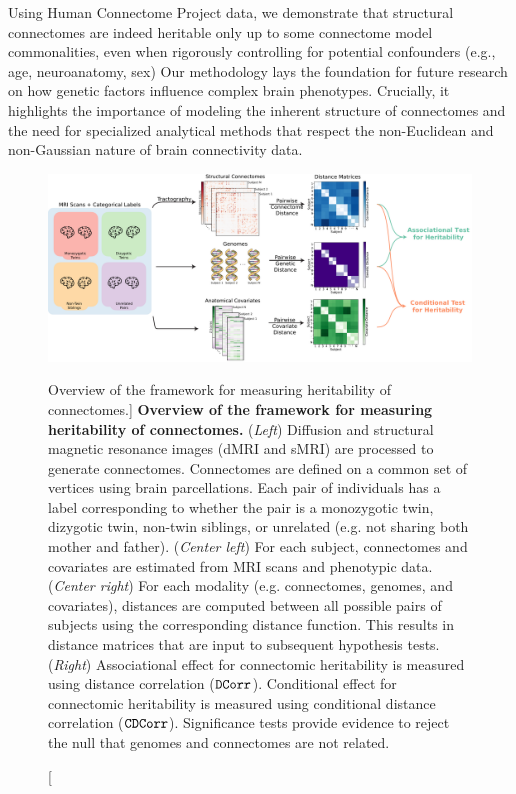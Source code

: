 Using Human Connectome Project data, we demonstrate that structural connectomes are indeed heritable only up to some connectome model commonalities, even when rigorously controlling for potential confounders (e.g., age, neuroanatomy, sex) 
Our methodology lays the foundation for future research on how genetic factors influence complex brain phenotypes. Crucially, it highlights the importance of modeling the inherent structure of connectomes and the need for specialized analytical methods that respect the non-Euclidean and non-Gaussian nature of brain connectivity data.

\begin{figure}%
  \centering
  \includegraphics[width=1\linewidth]{figures/herit/framework.pdf}
  \caption
  [Overview of the framework for measuring heritability of connectomes.]
  {\textbf{Overview of the framework for measuring heritability of connectomes.} (\textit{Left}) Diffusion and structural magnetic resonance images (dMRI and sMRI) are processed to generate connectomes. Connectomes are defined on a common set of vertices using brain parcellations. Each pair of individuals has a label corresponding to whether the pair is a monozygotic twin, dizygotic twin, non-twin siblings, or unrelated (e.g. not sharing both mother and father).
  (\textit{Center left}) For each subject, connectomes and covariates are estimated from MRI scans and phenotypic data.
  (\textit{Center right}) For each modality (e.g. connectomes, genomes, and covariates), distances are computed between all possible pairs of subjects using the corresponding distance function. This results in distance matrices that are input to subsequent hypothesis tests.
  (\textit{Right}) Associational effect for connectomic heritability is measured using distance correlation ($\operatorname{\mathtt{DCorr}}$). Conditional effect for connectomic heritability is measured using conditional distance correlation ($\operatorname{\mathtt{CDCorr}}$). Significance tests provide evidence to reject the null that genomes and connectomes are not related.}
\label{fig:framework}
\end{figure}
